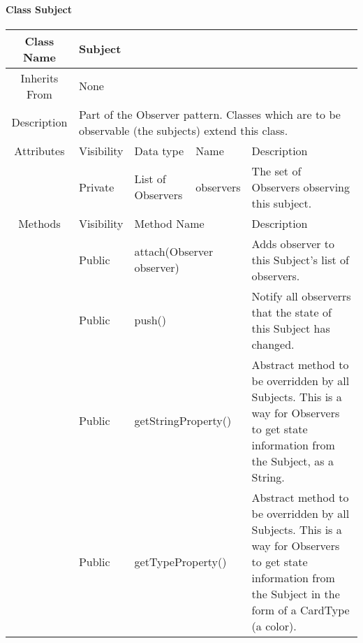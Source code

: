 \paragraph{Class Subject}\mbox{}
\begin{tabularx}{\textwidth}{|c||l|l|l|X|}
    \hline
    \cellcolor{lightgray}Class Name & \multicolumn{4}{X|}{Subject}\\
    \hline
    \cellcolor{lightgray}Inherits From & \multicolumn{4}{X|}{None}\\
    \hline
    \cellcolor{lightgray}Description & \multicolumn{4}{p{12cm}|}{Part of the Observer pattern. Classes which are to be observable (the subjects) extend this class.}\\
    \hline\hline
    
    \cellcolor{lightgray}Attributes & \cellcolor{lightgray}Visibility & \cellcolor{lightgray}Data type & \cellcolor{lightgray}Name & \cellcolor{lightgray}Description\\\cline{2-5}
    \cellcolor{lightgray} & Private & List of Observers & observers & The set of Observers observing this subject.\\ 
    \hline\hline
    
    \cellcolor{lightgray}Methods & \cellcolor{lightgray}Visibility & \multicolumn{2}{l|}{\cellcolor{lightgray}Method Name} & \cellcolor{lightgray}Description\\\cline{2-5}
    \hline
    \cellcolor{lightgray} & Public & \multicolumn{2}{l|}{attach(Observer observer)} & Adds observer to this Subject's list of observers.\\
    \hline
    \cellcolor{lightgray} & Public & \multicolumn{2}{l|}{push()} & Notify all observerrs that the state of this Subject has changed. \\
    \hline
    \cellcolor{lightgray} & Public & \multicolumn{2}{l|}{getStringProperty()} & Abstract method to be overridden by all Subjects. This is a way for Observers to get state information from the Subject, as a String. \\
    \hline
    \cellcolor{lightgray} & Public & \multicolumn{2}{l|}{getTypeProperty()} & Abstract method to be overridden by all Subjects. This is a way for Observers to get state information from the Subject in the form of a CardType (a color).\\
    \hline
\end{tabularx}